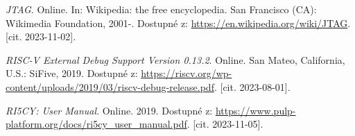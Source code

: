 \begin{thebibliography}{99}
\textit{JTAG}. Online. In: Wikipedia: the free encyclopedia. San Francisco (CA): Wikimedia Foundation, 2001-. Dostupné z: \url{https://en.wikipedia.org/wiki/JTAG}. [cit. 2023-11-02].

\textit{RISC-V External Debug Support Version 0.13.2}. Online. San Mateo, California, U.S.: SiFive, 2019. Dostupné z: \url{https://riscv.org/wp-content/uploads/2019/03/riscv-debug-release.pdf}. [cit. 2023-08-01].

\textit{RI5CY: User Manual}. Online. 2019. Dostupné z: \url{https://www.pulp-platform.org/docs/ri5cy\_user\_manual.pdf}. [cit. 2023-11-05].

\end{thebibliography}


%
%
%
